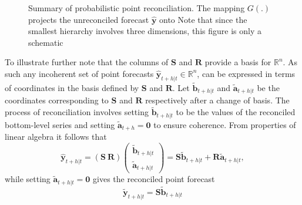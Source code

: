 \documentclass[a4paper, 11pt]{article}
\theoremstyle{theo}
\theoremstyle{definition}
\begin{document}
 
%


\begin{figure}
	
	\caption{Summary of probabilistic point reconciliation.  The mapping $G(.)$ projects the unreconciled forecast $\hat{\bm y}$ onto   Note that since the smallest hierarchy involves three dimensions, this figure is only a schematic}\label{fig:pointfr_sch} 
\end{figure}

To illustrate further note that the columns of $\bm{S}$ and $\bm{R}$ provide a basis for $\mathbb{R}^n$.  As such any incoherent set of point forecasts $\hat{\bm{y}}_{t+h|t} \in \mathbb{R}^n$, can be expressed in terms of coordinates in the basis defined by $\bm{S}$ and $\bm{R}$. Let $\tilde{\bm{b}}_{t+h|t}$ and $\tilde{\bm{a}}_{t+h|t}$ be the coordinates corresponding to $\bm{S}$ and $\bm{R}$ respectively after a change of basis. The process of reconciliation involves setting $\tilde{\bm{b}}_{t+h|t}$ to be the values of the reconciled bottom-level series and setting $\tilde{\bm{a}}_{t+h}=\bm{0}$ to ensure coherence. From properties of linear algebra it follows that 
\[
\hat{\bm{y}}_{t+h|t} = (\bm{S} ~ \bm{R})
\begin{pmatrix}
\tilde{\bm{b}}_{t+h|t}\\ \tilde{\bm{a}}_{t+h|t}
\end{pmatrix}= \bm{S}\tilde{\bm{b}}_{t+h|t} +  \bm{R}\tilde{\bm{a}}_{t+h|t},
\]
while setting $\tilde{\bm{a}}_{t+h|t}=\bm{0}$ gives the reconciled point forecast
\[
\tilde{\bm{y}}_{t+h|t} = \bm{S}\tilde{\bm{b}}_{t+h|t}
\]
\end{document}
